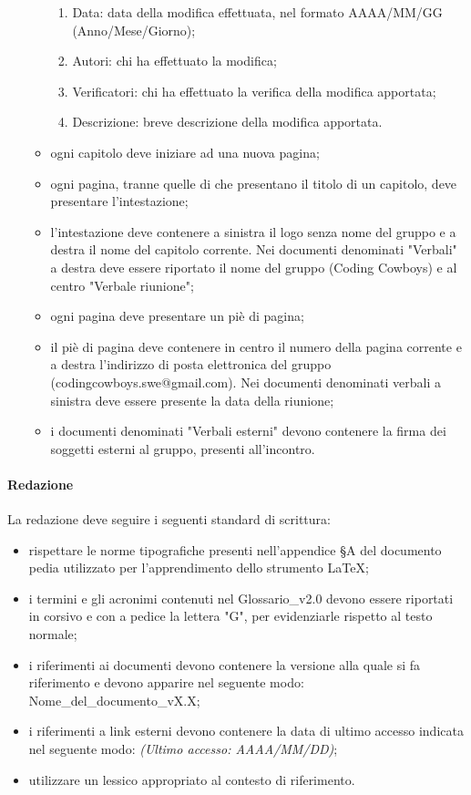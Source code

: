 \begin{enumerate}
\begin{itemize}
\begin{enumerate}
            \item Data: data della modifica effettuata, nel formato AAAA/MM/GG (Anno/Mese/Giorno);
            \item Autori: chi ha effettuato la modifica;
            \item Verificatori: chi ha effettuato la verifica della modifica apportata;
            \item Descrizione: breve descrizione della modifica apportata.
        \end{enumerate}
        \item ogni capitolo deve iniziare ad una nuova pagina;
        \item ogni pagina, tranne quelle di che presentano il titolo di un capitolo, deve presentare l'intestazione;
        \item l'intestazione deve contenere a sinistra il logo senza nome del gruppo e a destra il nome del capitolo corrente. Nei documenti denominati "Verbali" a destra deve essere riportato il nome del gruppo (Coding Cowboys) e al centro "Verbale riunione";
        \item ogni pagina deve presentare un piè di pagina;
        \item il piè di pagina deve contenere in centro il numero della pagina corrente e a destra l'indirizzo di posta elettronica del gruppo (codingcowboys.swe@gmail.com). Nei documenti denominati verbali a sinistra deve essere presente la data della riunione;
        \item i documenti denominati "Verbali esterni" devono contenere la firma dei soggetti esterni al gruppo, presenti all'incontro.
    \end{itemize}
\end{enumerate}

\paragraph{Redazione}
La redazione deve seguire i seguenti standard di scrittura:
\begin{itemize}
    \item rispettare le norme tipografiche presenti nell'appendice §A del documento pedia utilizzato per l'apprendimento dello strumento \LaTeX;
    \item i termini e gli acronimi contenuti nel Glossario\_v2.0 devono essere riportati in corsivo e con a pedice la lettera "G", per evidenziarle rispetto al testo normale;
    \item i riferimenti ai documenti devono contenere la versione alla quale si fa riferimento e devono apparire nel seguente modo: Nome\_del\_documento\_vX.X;
    \item i riferimenti a link esterni devono contenere la data di ultimo accesso indicata nel seguente modo: \textit{(Ultimo accesso: AAAA/MM/DD)};
    \item utilizzare un lessico appropriato al contesto di riferimento.
\end{itemize}

